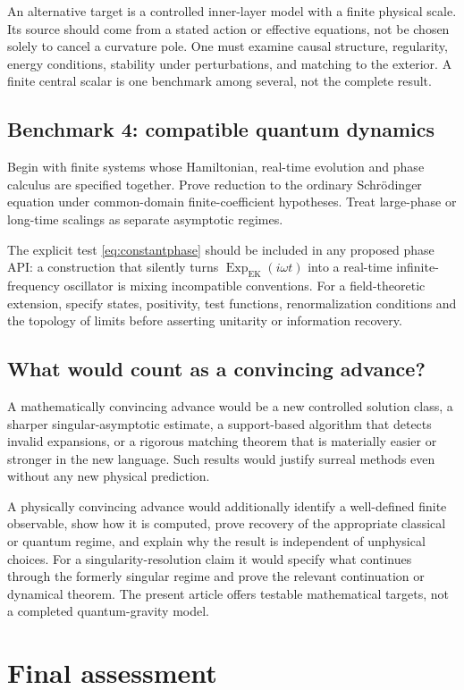 \documentclass[11pt,a4paper]{article}
\numberwithin{equation}{section}
\theoremstyle{definition}
\theoremstyle{remark}
\newcommand{\ExpEK}{\operatorname{Exp}_{\mathrm{EK}}}
\begin{document}
An alternative target is a controlled inner-layer model with a finite physical
scale. Its source should come from a stated action or effective equations,
not be chosen solely to cancel a curvature pole. One must examine causal
structure, regularity, energy conditions, stability under perturbations, and
matching to the exterior. A finite central scalar is one benchmark among
several, not the complete result.

\subsection{Benchmark 4: compatible quantum dynamics}
Begin with finite systems whose Hamiltonian, real-time evolution and phase
calculus are specified together. Prove reduction to the ordinary Schr\"odinger
equation under common-domain finite-coefficient hypotheses. Treat large-phase
or long-time scalings as separate asymptotic regimes.

The explicit test \eqref{eq:constantphase} should be included in any proposed
phase API: a construction that silently turns $\ExpEK(i\omega t)$ into a
real-time infinite-frequency oscillator is mixing incompatible conventions.
For a field-theoretic extension, specify states, positivity, test functions,
renormalization conditions and the topology of limits before asserting
unitarity or information recovery.

\subsection{What would count as a convincing advance?}
A mathematically convincing advance would be a new controlled solution class,
a sharper singular-asymptotic estimate, a support-based algorithm that detects
invalid expansions, or a rigorous matching theorem that is materially easier
or stronger in the new language. Such results would justify surreal methods
even without any new physical prediction.

A physically convincing advance would additionally identify a well-defined
finite observable, show how it is computed, prove recovery of the appropriate
classical or quantum regime, and explain why the result is independent of
unphysical choices. For a singularity-resolution claim it would specify what
continues through the formerly singular regime and prove the relevant
continuation or dynamical theorem. The present article offers testable
mathematical targets, not a completed quantum-gravity model.

\section{Final assessment}\label{sec:conclusion}
\end{document}
